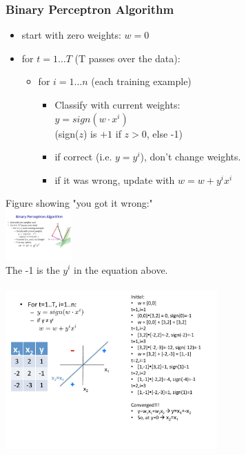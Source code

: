  \subsubsection{Binary Perceptron Algorithm}
 \begin{itemize}
 	\item start with zero weights: $w=0$
	\item for $ t = 1 \dots T$ (T passes over the data):
		\begin{itemize}
			\item for $i = 1 \dots n$ (each training example)
			\begin{itemize}
				\item  Classify with current weights: \hfill \\
					$ y = sign(w \cdot x^i)$ \hfill \\
					(sign($z$)  is $+1$ if $z > 0$, else -1) \hfill \\
				\item if correct (i.e. $y = y^i$), don't change weights.
				\item if it was wrong, update with $w = w + y^i x^i$
			\end{itemize}
		\end{itemize}
 \end{itemize}
Figure showing "you got it wrong:"  \hfill \\
 \includegraphics[width=1.0in]{figures/binary_perceptron_rule.pdf}  \hfill \\
 The -1 is the $y^i$ in the equation above.   \hfill \\
   \hfill \\
  
 \includegraphics[width=3.2in]{figures/perceptron_chugging_example.pdf}
 
